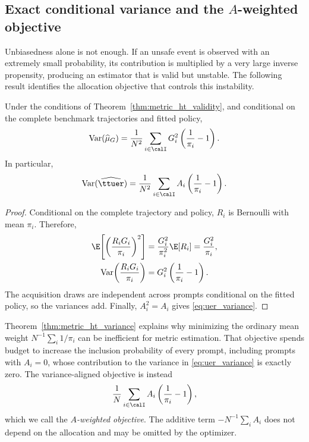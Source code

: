 \subsection{Exact conditional variance and the $A$-weighted objective}

Unbiasedness alone is not enough.  If an unsafe event is observed with an
extremely small probability, its contribution is multiplied by a very large
inverse propensity, producing an estimator that is valid but unstable.  The
following result identifies the allocation objective that controls this
instability.

\begin{theorem}
\label{thm:metric_ht_variance}
Under the conditions of Theorem~\ref{thm:metric_ht_validity}, and conditional
on the complete benchmark trajectories and fitted policy,
\begin{equation}
    \operatorname{Var}(\widehat\mu_G)
    =\frac{1}{N^2}\sum_{i\in\calI}
    G_i^2\left(\frac{1}{\pi_i}-1\right).
    \label{eq:general_metric_variance}
\end{equation}
In particular,
\begin{equation}
    \operatorname{Var}(\widehat{\ttuer})
    =\frac{1}{N^2}\sum_{i\in\calI}
    A_i\left(\frac{1}{\pi_i}-1\right).
    \label{eq:uer_variance}
\end{equation}
\end{theorem}

\begin{proof}
Conditional on the complete trajectory and policy, $R_i$ is Bernoulli with
mean $\pi_i$.  Therefore,
\begin{align}
    \E\!\left[\left(\frac{R_iG_i}{\pi_i}\right)^2\right]
    &=\frac{G_i^2}{\pi_i^2}\E[R_i]
      =\frac{G_i^2}{\pi_i},\\
    \operatorname{Var}\!\left(\frac{R_iG_i}{\pi_i}\right)
    &=G_i^2\left(\frac{1}{\pi_i}-1\right).
\end{align}
The acquisition draws are independent across prompts conditional on the
fitted policy, so the variances add.  Finally, $A_i^2=A_i$ gives
\eqref{eq:uer_variance}.
\end{proof}

Theorem~\ref{thm:metric_ht_variance} explains why minimizing the ordinary
mean weight $N^{-1}\sum_i1/\pi_i$ can be inefficient for metric estimation.
That objective spends budget to increase the inclusion probability of every
prompt, including prompts with $A_i=0$, whose contribution to the variance in
\eqref{eq:uer_variance} is exactly zero.  The variance-aligned objective is
instead
\begin{equation}
    \frac{1}{N}\sum_{i\in\calI}
    A_i\left(\frac{1}{\pi_i}-1\right),
    \label{eq:a_weighted_metric_objective}
\end{equation}
which we call the \emph{$A$-weighted objective}.  The additive term
$-N^{-1}\sum_iA_i$ does not depend on the allocation and may be omitted by
the optimizer.

